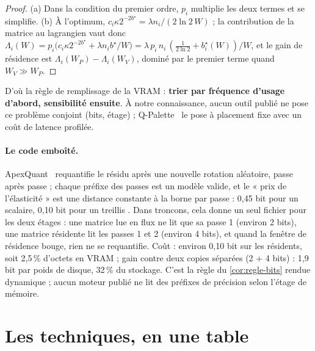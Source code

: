 \begin{proof}
(a) Dans la condition du premier ordre, $p_i$ multiplie les deux termes et se simplifie. (b) À l'optimum, $c_i \kappa 2^{-2b^\star} = \lambda n_i / (2 \ln 2\, W)$ ; la contribution de la matrice au lagrangien vaut donc $\Lambda_i(W) = p_i\bigl(c_i\kappa 2^{-2b^\star} + \lambda n_i b^\star/W\bigr) = \lambda\, p_i\, n_i\,(\tfrac{1}{2\ln 2} + b_i^\star(W))/W$, et le gain de résidence est $\Lambda_i(W_P) - \Lambda_i(W_V)$, dominé par le premier terme quand $W_V \gg W_P$.
\end{proof}

D'où la règle de remplissage de la VRAM : \textbf{trier par fréquence d'usage d'abord, sensibilité ensuite}. À notre connaissance, aucun outil publié ne pose ce problème conjoint (bits, étage) ; Q-Palette~\cite{qpalette2025} le pose à placement fixe avec un coût de latence profilée.

\paragraph{Le code emboîté.} ApexQuant~\cite{apexquant2026} requantifie le résidu après une nouvelle rotation aléatoire, passe après passe ; chaque préfixe des passes est un modèle valide, et le « prix de l'élasticité » est une distance constante à la borne par passe : 0,45 bit pour un scalaire, 0,10 bit pour un treillis \litt. Dans troncons, cela donne un seul fichier pour les deux étages : une matrice lue en flux ne lit que sa passe 1 (environ 2 bits), une matrice résidente lit les passes 1 et 2 (environ 4 bits), et quand la fenêtre de résidence bouge, rien ne se requantifie. Coût \calc : environ 0,10 bit sur les résidents, soit 2,5\,\% d'octets en VRAM ; gain contre deux copies séparées (2 + 4 bits) : 1,9 bit par poids de disque, 32\,\% du stockage. C'est la règle du \cref{cor:regle-bits} rendue dynamique ; aucun moteur publié ne lit des préfixes de précision selon l'étage de mémoire.

\section{Les techniques, en une table}\label{sec:techniques-quant}

